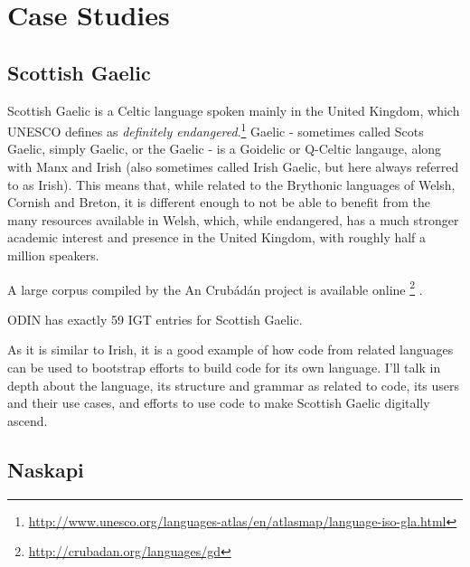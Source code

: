 \section{Case Studies}
\label{sec:case-studies}
\subsection{Scottish Gaelic}
\label{sec:gaelic}

Scottish Gaelic is a Celtic language spoken mainly in the United Kingdom, which UNESCO defines as {\it definitely endangered}.\footnote{\href{http://www.unesco.org/languages-atlas/en/atlasmap/language-iso-gla.html}{http://www.unesco.org/languages-atlas/en/atlasmap/language-iso-gla.html}} Gaelic - sometimes called Scots Gaelic, simply Gaelic, or the Gaelic - is a Goidelic or Q-Celtic langauge, along with Manx and Irish (also sometimes called Irish Gaelic, but here always referred to as Irish). This means that, while related to the Brythonic languages of Welsh, Cornish and Breton, it is different enough to not be able to benefit from the many resources available in Welsh, which, while endangered, has a much stronger academic interest and presence in the United Kingdom, with roughly half a million speakers.


A large corpus compiled by the An Crub\'ad\'an project is available online \footnote{\href{http://crubadan.org/languages/gd}{http://crubadan.org/languages/gd}} \citep{scannell2007crubadan}. %

ODIN has exactly 59 IGT entries for Scottish Gaelic.


As it is similar to Irish, it is a good example of how code from related languages can be used to bootstrap efforts to build code for its own language. I'll talk in depth about the language, its structure and grammar as related to code, its users and their use cases, and efforts to use code to make Scottish Gaelic digitally ascend.


\subsection{Naskapi}
\label{sec:naskapi}

